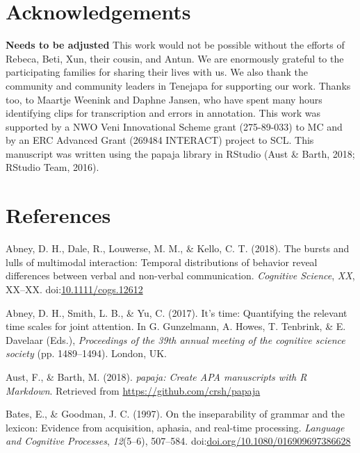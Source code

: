 \documentclass[floatsintext,man]{apa6}
\theoremstyle{definition}
\theoremstyle{definition}
\theoremstyle{definition}
\theoremstyle{remark}
\begin{document}
\section{Acknowledgements}\label{acknowledgements}

\textbf{Needs to be adjusted} This work would not be possible without
the efforts of Rebeca, Beti, Xun, their cousin, and Antun. We are
enormously grateful to the participating families for sharing their
lives with us. We also thank the community and community leaders in
Tenejapa for supporting our work. Thanks too, to Maartje Weenink and
Daphne Jansen, who have spent many hours identifying clips for
transcription and errors in annotation. This work was supported by a NWO
Veni Innovational Scheme grant (275-89-033) to MC and by an ERC Advanced
Grant (269484 INTERACT) project to SCL. This manuscript was written
using the papaja library in RStudio (Aust \& Barth, 2018; RStudio Team,
2016).

\newpage

\section{References}\label{refs}

\begingroup
\setlength{\parindent}{-0.5in} \setlength{\leftskip}{0.5in}

\hypertarget{refs}{}
\hypertarget{ref-abney2018bursts}{}
Abney, D. H., Dale, R., Louwerse, M. M., \& Kello, C. T. (2018). The
bursts and lulls of multimodal interaction: Temporal distributions of
behavior reveal differences between verbal and non-verbal communication.
\emph{Cognitive Science}, \emph{XX}, XX--XX.
doi:\href{https://doi.org/10.1111/cogs.12612}{10.1111/cogs.12612}

\hypertarget{ref-abney2017time}{}
Abney, D. H., Smith, L. B., \& Yu, C. (2017). It's time: Quantifying the
relevant time scales for joint attention. In G. Gunzelmann, A. Howes, T.
Tenbrink, \& E. Davelaar (Eds.), \emph{Proceedings of the 39th annual
meeting of the cognitive science society} (pp. 1489--1494). London, UK.

\hypertarget{ref-R-papaja}{}
Aust, F., \& Barth, M. (2018). \emph{papaja: Create APA manuscripts with
R Markdown}. Retrieved from \url{https://github.com/crsh/papaja}

\hypertarget{ref-bates1997inseparability}{}
Bates, E., \& Goodman, J. C. (1997). On the inseparability of grammar
and the lexicon: Evidence from acquisition, aphasia, and real-time
processing. \emph{Language and Cognitive Processes}, \emph{12}(5--6),
507--584.
doi:\href{https://doi.org/doi.org/10.1080/016909697386628}{doi.org/10.1080/016909697386628}
\end{document}
